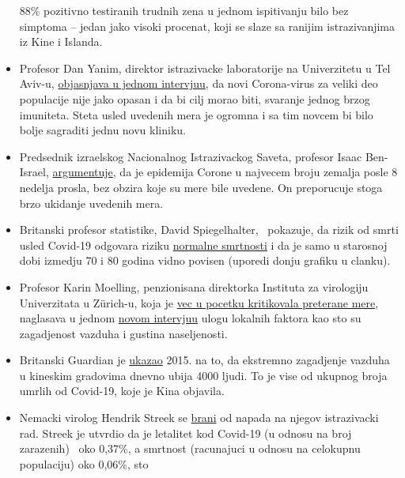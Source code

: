 \begin{itemize}
  88\% pozitivno testiranih trudnih zena u jednom ispitivanju bilo bez
  simptoma -- jedan jako visoki procenat, koji se slaze sa ranijim
  istrazivanjima iz Kine i Islanda.
\item
  Profesor Dan Yanim, direktor istrazivacke laboratorije na Univerzitetu
  u Tel Aviv-u,
  \href{https://www.ynet.co.il/articles/0,7340,L-5714371,00.html}{objasnjava
  u jednom intervjuu}, da novi Corona-virus za veliki deo populacije
  nije jako opasan i da bi cilj morao biti, svaranje jednog brzog
  imuniteta. Steta usled uvedenih mera je ogromna i sa tim novcem bi
  bilo bolje sagraditi jednu novu kliniku.
\item
  Predsednik izraelskog Nacionalnog Istrazivackog Saveta, profesor Isaac
  Ben-Israel,
  \href{http://www.israelnationalnews.com/News/News.aspx/278658}{argumentuje},
  da je epidemija Corone u najvecem broju zemalja posle 8 nedelja
  prosla, bez obzira koje su mere bile uvedene. On preporucuje stoga
  brzo ukidanje uvedenih mera.
\item
  Britanski profesor statistike, David Spiegelhalter, ~pokazuje, da
  rizik od smrti usled Covid-19 odgovara riziku
  \href{https://medium.com/wintoncentre/how-much-normal-risk-does-covid-represent-4539118e1196}{normalne
  smrtnosti} i da je samo u starosnoj dobi izmedju 70 i 80 godina vidno
  povisen (uporedi donju grafiku u clanku).
\item
  Profesor Karin Moelling, penzionisana direktorka Instituta za
  virologiju Univerzitata u Zürich-u, koja je
  \href{https://www.rubikon.news/artikel/die-stimme-der-vernunft}{vec u
  pocetku kritikovala preterane mere}, naglasava u jednom
  \href{https://www.youtube.com/watch?v=4rl2sqLcDoQ}{novom intervjuu}
  ulogu lokalnih faktora kao sto su zagadjenost vazduha i gustina
  naseljenosti.
\item
  Britanski Guardian je
  \href{https://www.theguardian.com/world/2015/aug/14/air-pollution-in-china-is-killing-4000-people-every-day-a-new-study-finds}{ukazao}
  2015. na to, da ekstremno zagadjenje vazduha u kineskim gradovima
  dnevno ubija 4000 ljudi. To je vise od ukupnog broja umrlih od
  Covid-19, koje je Kina objavila.
\item
  Nemacki virolog Hendrik Streek se
  \href{https://www.tagesspiegel.de/wissen/virologe-streeck-zur-coronavirus-studie-die-veroeffentlichung-zu-heinsberg-war-nicht-leichtfertig/25735672.html}{brani}
  od napada na njegov istrazivacki rad. Streek je utvrdio da je
  letalitet kod Covid-19 (u odnosu na broj zarazenih)~ oko 0,37\%, a
  smrtnost (racunajuci u odnosu na celokupnu populaciju) oko 0,06\%, sto

\end{itemize}
